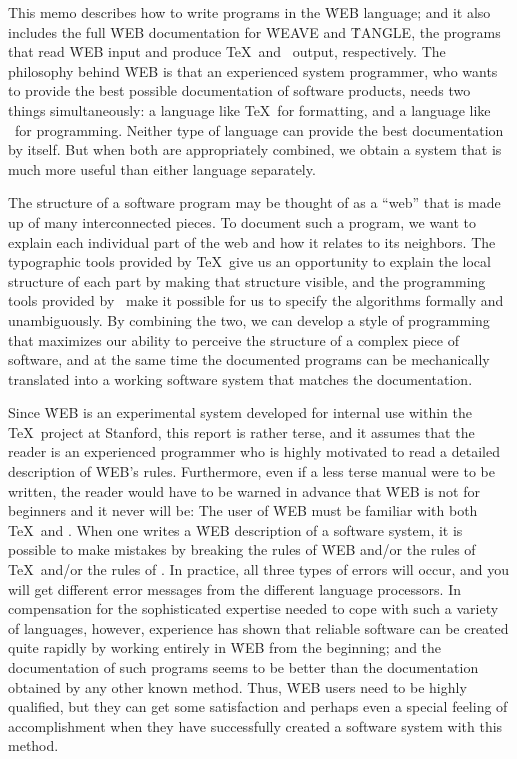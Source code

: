 \noindent This memo describes how to write programs in the
\.{WEB} language; and it also includes the full \.{WEB} documentation for
\.{WEAVE} and \.{TANGLE}, the programs that read \.{WEB} input and produce
\TeX\ and \PASCAL\ output, respectively. The philosophy behind \.{WEB} is
that an experienced system programmer, who wants to provide the best
possible documentation of software products, needs two things
simultaneously:  a language like \TeX\ for formatting, and a language like
\PASCAL\ for programming. Neither type of language can provide the best
documentation by itself. But when both are appropriately combined, we
obtain a system that is much more useful than either language separately.

The structure of a software program may be thought of as a ``web'' that is
made up of many interconnected pieces. To document such a program, we want
to explain each individual part of the web and how it relates to its
neighbors. The typographic tools provided by \TeX\ give us an opportunity
to explain the local structure of each part by making that structure
visible, and the programming tools provided by \PASCAL\ make it possible
for us to specify the algorithms formally and unambiguously. By combining
the two, we can develop a style of programming that maximizes our ability
to perceive the structure of a complex piece of software, and at the same
time the documented programs can be mechanically translated into a working
software system that matches the documentation.

Since \.{WEB} is an experimental system developed for internal use within
the \TeX\ project at Stanford, this report is rather terse, and it assumes
that the reader is an experienced programmer who is highly motivated to
read a detailed description of \.{WEB}'s rules. Furthermore, even if a
less terse manual were to be written, the reader would have to be warned
in advance that \.{WEB} is not for beginners and it never will be: The
user of \.{WEB} must be familiar with both \TeX\ and \PASCAL. When one
writes a \.{WEB} description of a software system, it is possible to make
mistakes by breaking the rules of \.{WEB} and/or the rules of \TeX\ and/or
the rules of \PASCAL. In practice, all three types of errors will occur,
and you will get different error messages from the different language
processors. In compensation for the sophisticated expertise needed to cope
with such a variety of languages, however, experience has shown that
reliable software can be created quite rapidly by working entirely in
\.{WEB} from the beginning; and the documentation of such programs seems
to be better than the documentation obtained by any other known method.
Thus, \.{WEB} users need to be highly qualified, but they can get some
satisfaction and perhaps even a special feeling of accomplishment when
they have successfully created a software system with this method.

